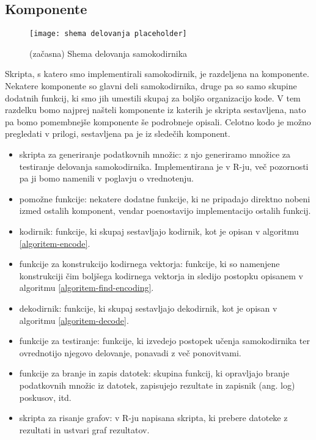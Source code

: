 \documentclass[12pt,a4paper,twoside]{article}
\theoremstyle{definition} %
\theoremstyle{plain} %
\numberwithin{equation}{section}  %
\begin{document}
\subsection{Komponente}

\begin{figure}[h!]

	\begin{center}
	\texttt{[image: shema delovanja placeholder]}
	\end{center}
	
	\caption{(začasna) Shema delovanja samokodirnika}
\end{figure}

Skripta, s katero smo implementirali samokodirnik, je razdeljena na komponente.
Nekatere komponente so glavni deli samokodirnika, druge pa so samo skupine dodatnih funkcij, ki smo jih umestili skupaj za boljšo organizacijo kode.
V tem razdelku bomo najprej našteli komponente iz katerih je skripta sestavljena, nato pa bomo pomembnejše komponente še podrobneje opisali.
Celotno kodo je možno pregledati v prilogi, sestavljena pa je iz sledečih komponent. %

\begin{itemize}
	\item skripta za generiranje podatkovnih množic: z njo generiramo množice za testiranje delovanja samokodirnika. 
	Implementirana je v R-ju, več pozornosti pa ji bomo namenili v poglavju o vrednotenju. %
	
	\item pomožne funkcije: nekatere dodatne funkcije, ki ne pripadajo direktno nobeni izmed ostalih komponent, 
	vendar poenostavijo implementacijo ostalih funkcij.

	\item kodirnik: funkcije, ki skupaj sestavljajo kodirnik, kot je opisan v algoritmu \ref{algoritem-encode}.

	\item funkcije za konstrukcijo kodirnega vektorja: 
	funkcije, ki so namenjene konstrukciji čim boljšega kodirnega vektorja in sledijo postopku opisanem v algoritmu \ref{algoritem-find-encoding}.

	\item dekodirnik: funkcije, ki skupaj sestavljajo dekodirnik, kot je opisan v algoritmu \ref{algoritem-decode}.

	\item funkcije za testiranje: funkcije, ki izvedejo postopek učenja samokodirnika ter ovrednotijo njegovo delovanje, ponavadi z več ponovitvami.

	\item funkcije za branje in zapis datotek: skupina funkcij, ki opravljajo branje podatkovnih množic iz datotek, zapisujejo rezultate in zapisnik (ang. log) poskusov, itd.

	\item skripta za risanje grafov: v R-ju napisana skripta, ki prebere datoteke z rezultati in ustvari graf rezultatov.
\end{itemize}
\end{document}
